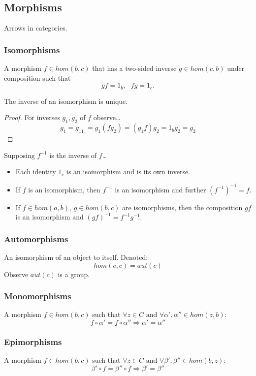 \subsection{Morphisms}\label{morphism}
Arrows in categories.

\subsubsection{Isomorphisms}\label{isomorphism}
A morphism $f \in hom(b,c)$ that has a two-sided inverse $g \in hom(c,b)$ under composition such that
$$gf = 1_b, \textrm{ } fg = 1_c.$$

\begin{proposition}
The inverse of an isomorphism is unique.
\end{proposition}

\begin{proof}
For inverses $g_1,g_2$ of $f$ observe\dots
$$g_1 = g_11_c = g_1(fg_2) = (g_1f)g_2 = 1_bg_2 = g_2$$
\end{proof}

\begin{proposition}
Supposing $f^{-1}$ is the inverse of $f$\dots
\begin{itemize}
  \item Each identity $1_c$ is an isomorphism and is its own inverse.
  \item If $f$ is an isomorphism, then $f^{-1}$ is an isomorphism and further $(f^{-1})^{-1} = f$.
  \item If $f \in hom(a,b)$, $g \in hom(b,c)$ are isomorphisms, then the composition $gf$ is an isomorphism and $(gf)^{-1} = f^{-1}g^{-1}$. 
\end{itemize}
\end{proposition}

\subsubsection{Automorphisms}\label{automorphism}
An isomorphism of an object to itself. Denoted:
$$hom(c,c) = aut(c)$$
Observe $aut(c)$ is a group.

\subsubsection{Monomorphisms}\label{monomorphism}
A morphism $f \in hom(b,c)$ such that $\forall z \in C \textrm{ and } \forall \alpha',\alpha'' \in hom(z,b)$:
$$f\circ\alpha'=f\circ\alpha'' \Rightarrow \alpha'=\alpha''$$

\subsubsection{Epimorphisms}\label{epimorphism}
A morphism $f \in hom(b,c)$ such that $\forall z \in C \textrm{ and } \forall \beta',\beta'' \in hom(b,z)$:
$$\beta'\circ f = \beta''\circ f \Rightarrow \beta'=\beta''$$